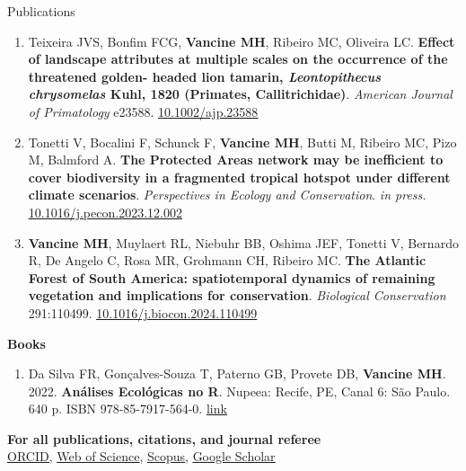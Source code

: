\documentclass{resume}
\begin{document}
\begin{rSection}{Publications}
\begin{enumerate}
\item Teixeira JVS, Bonfim FCG, {\bf Vancine MH}, Ribeiro MC, Oliveira LC. {\bf Effect
of landscape attributes at multiple scales on the occurrence of the threatened golden-
headed lion tamarin, \textbf{\textit{Leontopithecus chrysomelas}} Kuhl, 1820 (Primates, Callitrichidae)}.
{\it American Journal of Primatology} e23588. \href{https://doi.org/10.1002/ajp.23588}{\underline{10.1002/ajp.23588}}

\item Tonetti V, Bocalini F, Schunck F, {\bf Vancine MH}, Butti M, Ribeiro MC, Pizo M, Balmford A. {\bf The Protected Areas network may be inefficient to cover biodiversity in a fragmented tropical hotspot under different climate scenarios}. {\it Perspectives in Ecology and Conservation}. {\it in press.} \href{https://doi.org/10.1016/j.pecon.2023.12.002}{\underline{10.1016/j.pecon.2023.12.002}}

\item {\bf Vancine MH}, Muylaert RL, Niebuhr BB, Oshima JEF, Tonetti V, Bernardo R, De Angelo C, Rosa MR, Grohmann CH, Ribeiro MC. {\bf The Atlantic Forest of South America: spatiotemporal dynamics of remaining vegetation and implications for conservation}. {\it Biological Conservation} 291:110499. \href{https://doi.org/10.1016/j.biocon.2024.110499}{\underline{10.1016/j.biocon.2024.110499}}

\end{enumerate} 

{\bf Books}

\begin{enumerate} 
\item Da Silva FR, Gonçalves-Souza T, Paterno GB, Provete DB, {\bf Vancine MH}. 2022. {\bf Análises Ecológicas no R}. Nupeea: Recife, PE, Canal 6: São Paulo. 640 p. ISBN 978-85-7917-564-0. \href{https://analises-ecologicas.com/}{\underline{link}}
\end{enumerate} 

{\bf For all publications, citations, and journal referee}
\\ \href{https://orcid.org/0000-0001-9650-7575}{\underline{ORCID}}, \href{https://www.webofscience.com/wos/author/record/837504}{\underline{Web of Science}}, \href{https://www.scopus.com/authid/detail.uri?authorId=57193451888}{\underline{Scopus}}, \href{https://scholar.google.com/citations?user=i-2xZBQAAAAJ}{\underline{Google Scholar}}

\end{rSection}
\end{document}
